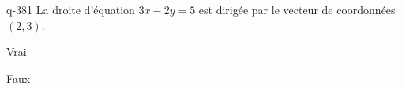 \begin{truefalse}{q-381}
La droite d'équation $3x-2y=5$ est dirigée par le vecteur de coordonnées $(2,3)$.
\item* Vrai
\item Faux
\end{truefalse}

